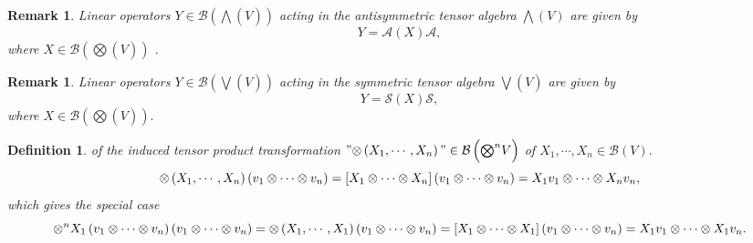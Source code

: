 \documentclass[aps,preprint]{revtex4}%
\newtheorem{definition}[theorem]{Definition}
\newtheorem{remark}[theorem]{Remark}
\begin{document}
\begin{remark}
Linear operators $Y\in\mathcal{B}\left(
{\textstyle\bigwedge}
\left(  \overset{}{V}\right)  \right)  $ acting in the antisymmetric tensor
algebra $%
{\textstyle\bigwedge}
\left(  V\right)  $ are given by
\begin{equation}
Y=\mathcal{A}\left(  X\right)  \mathcal{A},
\end{equation}
where $X\in\mathcal{B}\left(
{\textstyle\bigotimes}
\left(  \overset{}{V}\right)  \right)  $ .
\end{remark}

\begin{remark}
Linear operators $Y\in\mathcal{B}\left(
{\textstyle\bigvee}
\left(  \overset{}{V}\right)  \right)  $ acting in the symmetric tensor
algebra $%
{\textstyle\bigvee}
\left(  \overset{}{V}\right)  $ are given by
\begin{equation}
Y=\mathcal{S}\left(  X\right)  \mathcal{S},
\end{equation}
where $X\in\mathcal{B}\left(
{\textstyle\bigotimes}
\left(  \overset{}{V}\right)  \right)  .$
\end{remark}

\begin{definition}
of the induced tensor product transformation $"{\large \otimes}\left(
X_{1},\cdots,X_{n}\right)  "\in\mathcal{B}\left(  \overset{}{%
{\textstyle\bigotimes\nolimits^{n}}
V}\right)  $ of $X_{1},\cdots,X_{n}\in\mathcal{B}\left(  V\right)  .$
\begin{equation}
{\large \otimes}\left(  X_{1},\cdots,X_{n}\right)  \left(  v_{1}\otimes
\cdots\otimes v_{n}\right)  =\left[  X_{1}\otimes\cdots\otimes X_{n}\right]
\left(  v_{1}\otimes\cdots\otimes v_{n}\right)  =X_{1}v_{1}\otimes
\cdots\otimes X_{n}v_{n},
\end{equation}
which gives the special case%
\begin{equation}
\otimes^{n}X_{1}\left(  v_{1}\otimes\cdots\otimes v_{n}\right)  \left(
v_{1}\otimes\cdots\otimes v_{n}\right)  ={\large \otimes}\left(  X_{1}%
,\cdots,X_{1}\right)  \left(  v_{1}\otimes\cdots\otimes v_{n}\right)  =\left[
X_{1}\otimes\cdots\otimes X_{1}\right]  \left(  v_{1}\otimes\cdots\otimes
v_{n}\right)  =X_{1}v_{1}\otimes\cdots\otimes X_{1}v_{n}.
\end{equation}

\end{definition}
\end{document}
